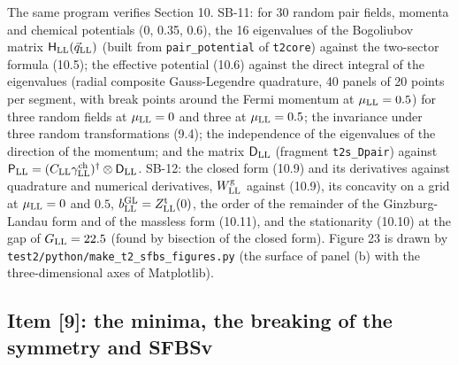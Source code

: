 \documentclass[
  10pt,
]{article}
\begin{document}
The same program verifies Section 10. SB-11: for 30 random pair fields,
momenta and chemical potentials (0, 0.35, 0.6), the 16 eigenvalues of
the Bogoliubov matrix \(\mathsf H_{\rm LL}(\vec q_{\rm LL})\) (built
from \texttt{pair\_potential} of \texttt{t2core}) against the two-sector
formula (10.5); the effective potential (10.6) against the direct
integral of the eigenvalues (radial composite Gauss-Legendre quadrature,
40 panels of 20 points per segment, with break points around the Fermi
momentum at \(\mu_{\rm LL}=0.5\)) for three random fields at
\(\mu_{\rm LL}=0\) and three at \(\mu_{\rm LL}=0.5\); the invariance
under three random transformations (9.4); the independence of the
eigenvalues of the direction of the momentum; and the matrix
\(\mathsf D_{\rm LL}\) (fragment \texttt{t2s\_Dpair}) against
\(\mathsf P_{\rm LL}=(C_{\rm LL}\gamma^{\rm ch}_{\rm LL})^\dagger\otimes\mathsf D_{\rm LL}\).
SB-12: the closed form (10.9) and its derivatives against quadrature and
numerical derivatives, \(W^{\rm g}_{\rm LL}\) against (10.9), its
concavity on a grid at \(\mu_{\rm LL}=0\) and \(0.5\),
\(b^{\rm GL}_{\rm LL}=Z^{\rm t}_{\rm LL}(0)\), the order of the
remainder of the Ginzburg-Landau form and of the massless form (10.11),
and the stationarity (10.10) at the gap of \(G_{\rm LL}=22.5\) (found by
bisection of the closed form). Figure 23 is drawn by
\texttt{test2/python/make\_t2\_sfbs\_figures.py} (the surface of panel
(b) with the three-dimensional axes of Matplotlib).

\hypertarget{item-9-the-minima-the-breaking-of-the-symmetry-and-sfbsv}{%
\subsection{Item {[}9{]}: the minima, the breaking of the symmetry and
SFBSv}\label{item-9-the-minima-the-breaking-of-the-symmetry-and-sfbsv}}
\end{document}
